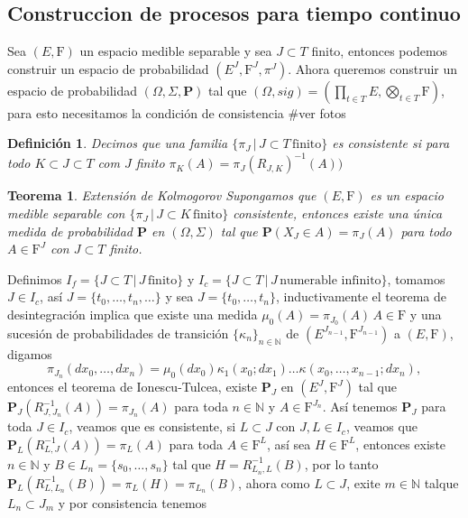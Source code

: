 \documentclass[letterpaper]{article}
\newtheorem{teorema}{Teorema}[section]
\newtheorem{def.}{Definici\'on}[section]
\newcommand{\nat}{\ensuremath{ \mathbb N }}
\newcommand{\prob}{\textbf{P}}
\newcommand{\dem}{{\noindent \sc Demostraci\'on. }}
\newcommand{\om}{\ensuremath{\Omega}}
\newcommand{\sig}{\ensuremath{\Sigma}}
\begin{document}
\subsection{Construccion de procesos para tiempo continuo}
\label{sec:org2bdd0ee}
Sea \((E,\mathrm{F})\) un espacio medible separable y sea \(J\subset T\) finito, entonces podemos construir un espacio de probabilidad \((E^{J},\mathrm{F}^{J},\pi^{J})\). Ahora queremos construir un espacio de probabilidad \((\om,\sig,\prob)\) tal que \((\om,sig)=(\prod_{t\in T}E,\bigotimes_{t\in T}\mathrm{F})\), para esto necesitamos la condición de consistencia
\#ver fotos
\begin{def.}
Decimos que una familia \(\{\pi_J\,\vert\,J\subset T\,\text{finito}\}\) es consistente si para todo \(K\subset J\subset T\) com \(J\) finito
\(\pi_K(A)=\pi_J(R_{J,K})^{-1}(A))\)
\end{def.}
\begin{teorema}{Extensión de Kolmogorov}
Supongamos que $(E,\mathrm{F})$ es un espacio medible separable con $\{\pi_J\,\vert\, J\subset K\,\text{finito}\}$ consistente, entonces existe una única medida de probabilidad $\prob$ en $(\om,\sig)$ tal que $\prob(X_J\in A)=\pi_J(A)$ para todo $A\in\mathrm{F}^J$ con $J\subset T$ finito.
\end{teorema}
\noindent\dem Definimos \(I_f=\{J\subset T\,\vert\,J\,\text{finito}\}\) y \(I_c=\{J\subset T\,\vert\,J\,\text{numerable infinito}\}\), tomamos \(J\in I_c\), así \(J=\{t_0,\dots,t_n,\dots\}\) y sea \(J=\{t_0,\dots,t_n\}\), inductivamente el teorema de desintegración implica que existe una medida \(\mu_0(A)=\pi_{J_0}(A)\,A\in\mathrm{F}\) y una sucesión de probabilidades de transición \(\{\kappa_n\}_{n\in\nat}\) de \((E^{J_{n-1}},\mathrm{F}^{J_{n-1}})\) a \((E,\mathrm{F})\), digamos
\[
    \pi_{J_n}(dx_0,\dots,dx_n)=\mu_0(dx_0)\kappa_1(x_0;dx_1)\dots\kappa(x_0,\dots,x_{n-1};dx_{n}),
\]
\noindent entonces el teorema de Ionescu-Tulcea, existe \(\prob_J\) en \((E^J,\mathrm{F}^J)\) tal que \(\prob_J(R^{-1}_{J,J_{n}}(A))=\pi_{J_n}(A)\) para toda \(n\in\nat\) y \(A\in\mathrm{F}^{J_n}\). Así tenemos \(\prob_J\) para toda \(J\in I_c\), veamos que es consistente, si \(L\subset J\) con \(J,L\in I_c\), veamos que \(\prob_L(R^{-1}_{L,J}(A))=\pi_{L}(A)\) para toda \(A\in\mathrm{F}^{L}\), así sea \(H\in\mathrm{F}^{L}\), entonces existe \(n\in\nat\) y \(B\in L_n=\{s_0,\dots,s_n\}\) tal que \(H=R^{-1}_{L_{n},L}(B)\), por lo tanto \(\prob_L(R^{-1}_{L,L_{n}}(B))=\pi_{L}(H)=\pi_{L_{n}}(B)\), ahora como \(L\subset J\), exite \(m\in\nat\) talque \(L_n\subset J_m\) y por consistencia tenemos
\end{document}
